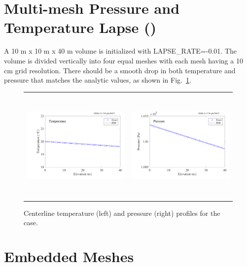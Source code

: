 \documentclass[11pt]{book}
\begin{document}
\newpage

\section{Multi-mesh Pressure and Temperature Lapse (\texorpdfstring{}{lapse\_rate})}
\label{lapse_rate}

A 10 m x 10 m x 40 m volume is initialized with {\ct LAPSE\_RATE=-0.01}.  The volume is divided vertically into four equal meshes with each mesh having a 10 cm grid resolution.  There should be a smooth drop in both temperature and pressure that matches the analytic values, as shown in Fig.~\ref{lapse_rate_fig}.

\begin{figure}[!ht]
\begin{tabular*}{\textwidth}{lr}
\includegraphics[height=2.2in]{SCRIPT_FIGURES/lapse_rate_T} &
\includegraphics[height=2.2in]{SCRIPT_FIGURES/lapse_rate_P}
\end{tabular*}
\caption[The  test case]{Centerline temperature (left) and pressure (right) profiles for the  case.}
\label{lapse_rate_fig}
\end{figure}


\newpage

\section{Embedded Meshes}
\end{document}
